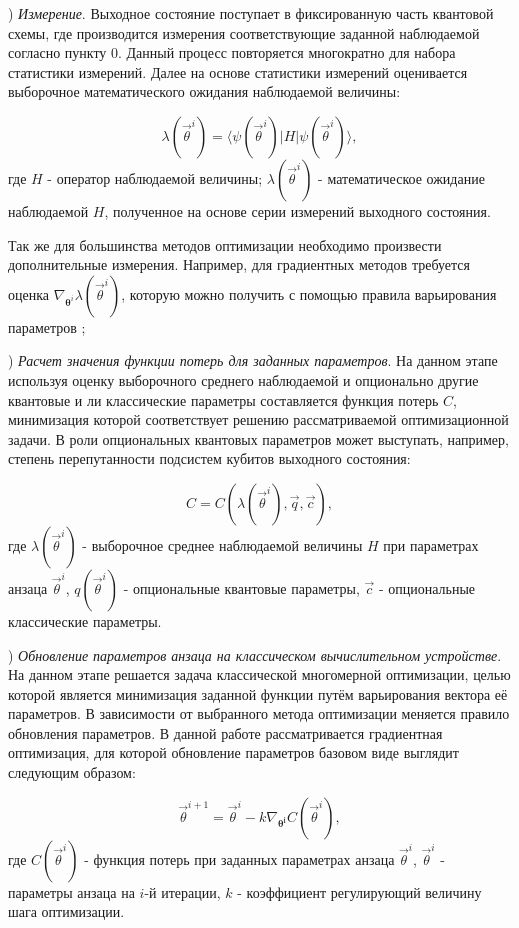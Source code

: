 \documentclass[14pt]{extarticle}
\begin{document}
) \emph{Измерение}. Выходное состояние поступает в фиксированную часть квантовой схемы, где производится измерения соответствующие заданной наблюдаемой согласно пункту 0. Данный процесс повторяется многократно для набора статистики измерений. Далее на основе статистики измерений оценивается выборочное математического ожидания наблюдаемой величины:

\begin{equation}
\lambda(\vec{\theta}^{i}) = \langle \psi(\vec{\theta}^{i}) |H|\psi(\vec{\theta}^{i})\rangle,
\end{equation} где $H$ - оператор наблюдаемой величины; $\lambda(\vec{\theta}^{i})$ - математическое ожидание наблюдаемой $H$, полученное на основе серии измерений выходного состояния.

\qquad Так же для большинства методов оптимизации необходимо произвести дополнительные измерения. Например, для градиентных методов требуется оценка $ \nabla_{\mathbf{\theta}^{i}} \lambda(\vec{\theta}^{i})$, которую можно получить с помощью правила варьирования параметров \cite{param_shift};
 
 ) \emph{Расчет значения функции потерь для заданных параметров}. На данном этапе используя оценку выборочного среднего наблюдаемой и опционально другие квантовые и ли классические параметры составляется функция потерь $C$, минимизация которой соответствует решению рассматриваемой оптимизационной задачи. В роли опциональных квантовых параметров может выступать, например, степень перепутанности подсистем кубитов выходного состояния:

\begin{equation}
C = C(\lambda(\vec{\theta}^i), \vec{q}, \vec{c}),
\end{equation} где $\lambda(\vec{\theta}^i)$ - выборочное среднее наблюдаемой величины $H$ при параметрах анзаца $\vec{\theta}^i$, $q(\vec{\theta}^i)$ - опциональные квантовые параметры, $\vec{c}$ - опциональные классические параметры.

) \emph{Обновление параметров анзаца на классическом вычислительном устройстве}.
На данном этапе решается задача классической многомерной оптимизации, целью которой является минимизация заданной функции путём варьирования вектора её параметров. В зависимости от выбранного метода оптимизации меняется правило обновления параметров. В данной работе рассматривается градиентная оптимизация, для которой обновление параметров базовом виде выглядит следующим образом:

\begin{equation}
\vec{\theta}^{i+1} = \vec{\theta}^{i} - k \nabla_{\mathbf{\theta^{i}}} C(\vec{\theta}^{i}),
\end{equation} где $C(\vec{\theta}^{i})$ - функция потерь при заданных параметрах анзаца $\vec{\theta}^{i}$, $\vec{\theta}^{i}$ - параметры анзаца на $i$-й итерации, $k$ - коэффициент регулирующий величину шага оптимизации.
\end{document}
